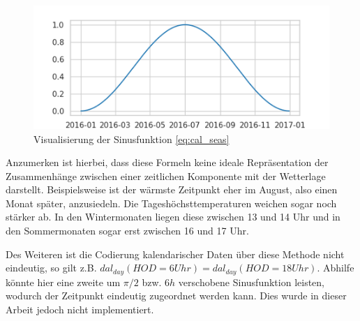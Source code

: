 \documentclass[
12pt, %
toc=listofnumbered, %
toc=chapterentrydotfill, %
numbers=noenddot, %
captions=tableheading, %
bibliography=numbered
]{scrreprt}
\let\Oldsubsection\subsection
\renewcommand{\subsection}{\FloatBarrier\Oldsubsection}
\newcommand{\highlight}[1]{\textbf{\textcolor{red}{#1}}}
\begin{document}
\begin{itemize}
	\begin{figure}[tph]
		\begin{center}
			\includegraphics[]{./images/sinusdatum.png}
			\caption{Visualisierung der Sinusfunktion \ref{eq:cal_seas}}
			\label{fig:sinusjahr}
		\end{center}
	\end{figure}

\end{itemize}

Anzumerken ist hierbei, dass diese Formeln keine ideale Repräsentation der Zusammenhänge zwischen einer zeitlichen Komponente mit der Wetterlage darstellt. Beispielsweise ist der wärmste Zeitpunkt eher im August, also einen Monat später, anzusiedeln. Die Tageshöchsttemperaturen weichen sogar noch stärker ab. In den Wintermonaten liegen diese zwischen 13 und 14 Uhr und in den Sommermonaten sogar erst zwischen 16 und 17 Uhr. \cite{2017__WarumIstEs}

Des Weiteren ist die Codierung kalendarischer Daten über diese Methode nicht eindeutig, so gilt z.B. $dal_{day}(HOD=6Uhr) = dal_{day}(HOD=18Uhr)$. Abhilfe könnte hier eine zweite um $\pi/2$ bzw. $6h$ verschobene Sinusfunktion leisten, wodurch der Zeitpunkt eindeutig zugeordnet werden kann. Dies wurde in dieser Arbeit jedoch nicht implementiert.

\end{document}
